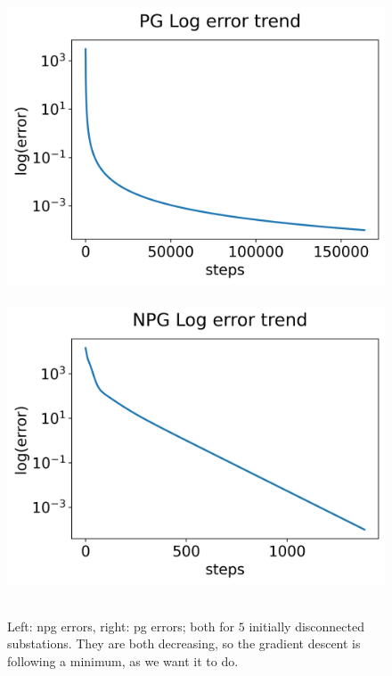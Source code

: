 \begin{figure}[htb]
    \centering
    \mbox{
        \hspace*{-10pt}\includegraphics[scale=0.52]{chapters/figures/errors_log_PG.png}
        \hspace*{-5pt}\includegraphics[scale=0.52]{chapters/figures/errors_log_NPG.png}
    }
    \caption{Left: \acrshort{npg} errors, right: \acrshort{pg} errors; both for $5$ initially disconnected substations. They are both decreasing, so the gradient descent is following a minimum, as we want it to do.}
    \label{fig:errors}
\end{figure}

